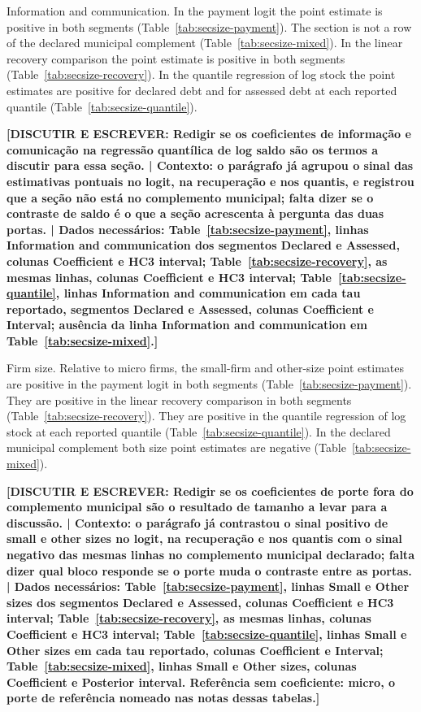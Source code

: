Information and communication.
In the payment logit the point estimate is positive in both segments (Table~\ref{tab:secsize-payment}).
The section is not a row of the declared municipal complement (Table~\ref{tab:secsize-mixed}).
In the linear recovery comparison the point estimate is positive in both segments (Table~\ref{tab:secsize-recovery}).
In the quantile regression of log stock the point estimates are positive for declared debt and for assessed debt at each reported quantile (Table~\ref{tab:secsize-quantile}).

\textbf{[DISCUTIR E ESCREVER: Redigir se os coeficientes de informação e comunicação na regressão quantílica de log saldo são os termos a discutir para essa seção. | Contexto: o parágrafo já agrupou o sinal das estimativas pontuais no logit, na recuperação e nos quantis, e registrou que a seção não está no complemento municipal; falta dizer se o contraste de saldo é o que a seção acrescenta à pergunta das duas portas. | Dados necessários: Table~\ref{tab:secsize-payment}, linhas Information and communication dos segmentos Declared e Assessed, colunas Coefficient e HC3 interval; Table~\ref{tab:secsize-recovery}, as mesmas linhas, colunas Coefficient e HC3 interval; Table~\ref{tab:secsize-quantile}, linhas Information and communication em cada tau reportado, segmentos Declared e Assessed, colunas Coefficient e Interval; ausência da linha Information and communication em Table~\ref{tab:secsize-mixed}.]}

Firm size.
Relative to micro firms, the small-firm and other-size point estimates are positive in the payment logit in both segments (Table~\ref{tab:secsize-payment}).
They are positive in the linear recovery comparison in both segments (Table~\ref{tab:secsize-recovery}).
They are positive in the quantile regression of log stock at each reported quantile (Table~\ref{tab:secsize-quantile}).
In the declared municipal complement both size point estimates are negative (Table~\ref{tab:secsize-mixed}).

\textbf{[DISCUTIR E ESCREVER: Redigir se os coeficientes de porte fora do complemento municipal são o resultado de tamanho a levar para a discussão. | Contexto: o parágrafo já contrastou o sinal positivo de small e other sizes no logit, na recuperação e nos quantis com o sinal negativo das mesmas linhas no complemento municipal declarado; falta dizer qual bloco responde se o porte muda o contraste entre as portas. | Dados necessários: Table~\ref{tab:secsize-payment}, linhas Small e Other sizes dos segmentos Declared e Assessed, colunas Coefficient e HC3 interval; Table~\ref{tab:secsize-recovery}, as mesmas linhas, colunas Coefficient e HC3 interval; Table~\ref{tab:secsize-quantile}, linhas Small e Other sizes em cada tau reportado, colunas Coefficient e Interval; Table~\ref{tab:secsize-mixed}, linhas Small e Other sizes, colunas Coefficient e Posterior interval. Referência sem coeficiente: micro, o porte de referência nomeado nas notas dessas tabelas.]}

